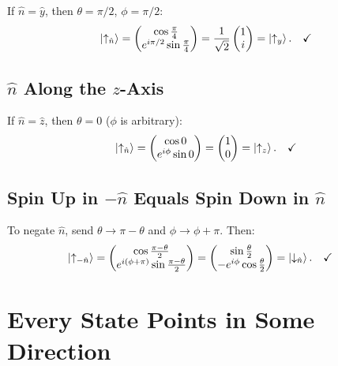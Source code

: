 \documentclass[11pt,a4paper]{article}
\theoremstyle{definition}
\theoremstyle{plain}
\theoremstyle{remark}
\begin{document}
If $\hat{n} = \hat{y}$, then $\theta = \pi/2$, $\phi = \pi/2$:
\[
    \ket{\uparrow_{\hat{n}}} = \begin{pmatrix}\cos\frac{\pi}{4} \\ e^{i\pi/2}\sin\frac{\pi}{4}\end{pmatrix} = \frac{1}{\sqrt{2}}\begin{pmatrix}1\\i\end{pmatrix} = \ket{\uparrow_y}. \quad\checkmark
\]

\subsection{$\hat{n}$ Along the $z$-Axis}

If $\hat{n} = \hat{z}$, then $\theta = 0$ ($\phi$ is arbitrary):
\[
    \ket{\uparrow_{\hat{n}}} = \begin{pmatrix}\cos 0 \\ e^{i\phi}\sin 0\end{pmatrix} = \begin{pmatrix}1\\0\end{pmatrix} = \ket{\uparrow_z}. \quad\checkmark
\]

\subsection{Spin Up in $-\hat{n}$ Equals Spin Down in $\hat{n}$}

To negate $\hat{n}$, send $\theta \to \pi - \theta$ and $\phi \to \phi + \pi$. Then:
\begin{align}
    \ket{\uparrow_{-\hat{n}}} &= \begin{pmatrix} \cos\frac{\pi-\theta}{2} \\ e^{i(\phi+\pi)}\sin\frac{\pi-\theta}{2} \end{pmatrix} = \begin{pmatrix} \sin\frac{\theta}{2} \\ -e^{i\phi}\cos\frac{\theta}{2} \end{pmatrix} = \ket{\downarrow_{\hat{n}}}. \quad\checkmark
\end{align}

\section{Every State Points in Some Direction}
\end{document}
